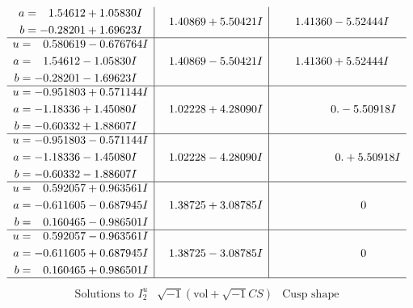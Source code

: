 \documentclass[1p]{elsarticle_modified}
\theoremstyle{definition}
\newcommand{\I}{\sqrt{-1}}
\begin{document}
$$\begin{array}{c|c|c}
\begin{aligned}
a &= \phantom{-}1.54612 + 1.05830 I \\
b &= -0.28201 + 1.69623 I\end{aligned}
 & \phantom{-}1.40869 + 5.50421 I & \phantom{-}1.41360 - 5.52444 I \\ \hline\begin{aligned}
u &= \phantom{-}0.580619 - 0.676764 I \\
a &= \phantom{-}1.54612 - 1.05830 I \\
b &= -0.28201 - 1.69623 I\end{aligned}
 & \phantom{-}1.40869 - 5.50421 I & \phantom{-}1.41360 + 5.52444 I \\ \hline\begin{aligned}
u &= -0.951803 + 0.571144 I \\
a &= -1.18336 + 1.45080 I \\
b &= -0.60332 + 1.88607 I\end{aligned}
 & \phantom{-}1.02228 + 4.28090 I & \phantom{-0.000000 } 0. - 5.50918 I \\ \hline\begin{aligned}
u &= -0.951803 - 0.571144 I \\
a &= -1.18336 - 1.45080 I \\
b &= -0.60332 - 1.88607 I\end{aligned}
 & \phantom{-}1.02228 - 4.28090 I & \phantom{-0.000000 -}0. + 5.50918 I \\ \hline\begin{aligned}
u &= \phantom{-}0.592057 + 0.963561 I \\
a &= -0.611605 - 0.687945 I \\
b &= \phantom{-}0.160465 - 0.986501 I\end{aligned}
 & \phantom{-}1.38725 + 3.08785 I & \phantom{-0.000000 } 0 \\ \hline\begin{aligned}
u &= \phantom{-}0.592057 - 0.963561 I \\
a &= -0.611605 + 0.687945 I \\
b &= \phantom{-}0.160465 + 0.986501 I\end{aligned}
 & \phantom{-}1.38725 - 3.08785 I & \phantom{-0.000000 } 0\\
 \hline 
 \end{array}$$\newpage$$\begin{array}{c|c|c}  
\text{Solutions to }I^u_{2}& \I (\text{vol} + \sqrt{-1}CS) & \text{Cusp shape}\\
 \hline 
\begin{aligned}

\end{aligned}
\end{array}$$
\end{document}
